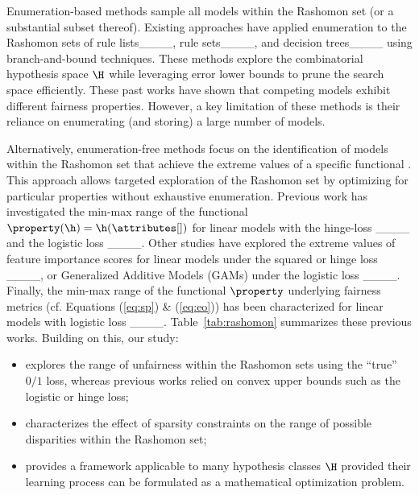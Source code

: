 Enumeration-based methods sample all models within the Rashomon set (or a substantial subset thereof). Existing approaches have applied enumeration to the Rashomon sets of rule lists____, rule sets____, and decision trees____ using branch-and-bound techniques. These methods explore the combinatorial hypothesis space $\H$ while leveraging error lower bounds to prune the search space efficiently. These past works have shown that competing models exhibit different fairness properties. However, a key limitation of these methods is their reliance on enumerating (and storing) a large number of models.



Alternatively, enumeration-free methods focus on the identification of models within the Rashomon set that achieve the extreme values of a specific functional \smash{$\property: \H \rightarrow \R$}.
This approach allows targeted exploration of the Rashomon set by optimizing for particular properties without exhaustive enumeration. Previous work has investigated the min-max range of the functional $\property(\h)=\h(\attributes[])$ for 
linear models with the hinge-loss ____ and the logistic loss ____. 
Other studies have explored the extreme values of feature importance scores for linear models under the squared or hinge loss ____, or Generalized Additive Models (GAMs) under the logistic loss ____. 
Finally, the min-max range of the functional $\property$ underlying fairness metrics (cf. Equations (\ref{eq:sp}) \& (\ref{eq:eo})) has been characterized for linear models with logistic loss ____. 
Table~\ref{tab:rashomon} summarizes these previous works. Building on this, our study:
\begin{itemize}
    \item explores the range of unfairness within the Rashomon sets using the ``true'' $0/1$ loss, whereas previous works relied on convex upper bounds such as the logistic or hinge loss;
    \item characterizes the effect of sparsity constraints on the range of possible disparities within the Rashomon set;
    \item provides a framework applicable to many hypothesis classes $\H$
    provided their learning process can be formulated as a mathematical optimization problem.
\end{itemize}